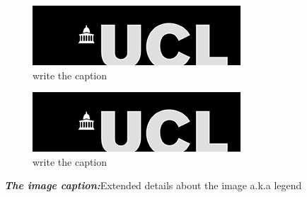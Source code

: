 \begin{figure}[H]
    \begin{flushleft}
    \begin{subfigure}[b]{0.5\textwidth}
    \includegraphics[width=\textwidth]{Image/ucl_logo.png}
    \caption{write the caption}\label{fig:subfig1}
    \end{subfigure}
    \end{flushleft}
        \hfill
\begin{subfigure}[b]{0.5\textwidth}
    \begin{flushright}
    \includegraphics[width=\textwidth]{Image/ucl_logo.png}
    \caption{write the caption}
    \label{fig:subfig2}
    \end{flushright}
\end{subfigure}
    \caption[The caption that goes into the list of figures]{\textbf{\textit{The image caption:}}Extended details about the image a.k.a legend}
    \label{fig:Gel Extaction}
\end{figure}


\noindent \blindtext 


